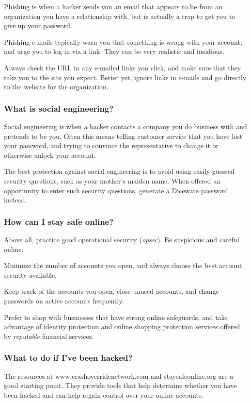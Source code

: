 Phishing is when a hacker sends you an email that appears to be from an organization you have a relationship with, but is actually a trap to get you to give up your password.

Phishing e-mails typically warn you that something is wrong with your account, and urge you to log in via a link. They can be very realistic and insidious.

Always check the URL in any e-mailed links you click, and make sure that they take you to the site you expect. Better yet, ignore links in e-mails and go directly to the website for the organization.

\subsubsection{What is social engineering?}

Social engineering is when a hacker contacts a company you do business with and pretends to be you. Often this means telling customer service that you have lost your password, and trying to convince the representative to change it or otherwise unlock your account.

The best protection against social engineering is to avoid using easily-guessed security questions, such as your mother's maiden name. When offered an opportunity to enter such security questions, generate a Diceware password instead.

\subsubsection{How can I stay safe online?}

Above all, practice good operational security (\textit{opsec}). Be suspicious and careful online.

Minimize the number of accounts you open, and always choose the best account security available.

Keep track of the accounts you open, close unused accounts, and change passwords on active accounts frequently.

Prefer to shop with businesses that have strong online safeguards, and take advantage of identity protection and online shopping protection services offered by \textit{reputable} financial services.

\subsubsection{What to do if I've been hacked?}

The resources at www.crashoverridenetwork.com and staysafeonline.org are a good starting point. They provide tools that help determine whether you have been hacked and can help regain control over your online accounts.
